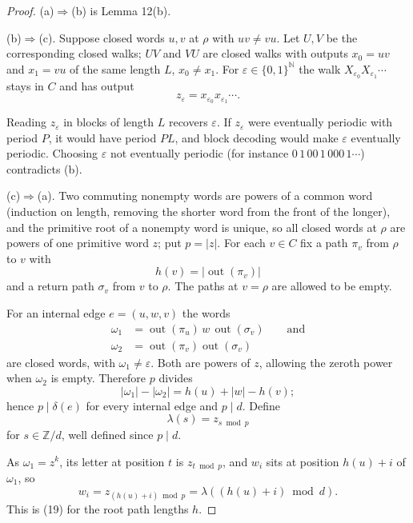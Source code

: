 \documentclass[11pt,reqno]{amsart}
\theoremstyle{definition}
\theoremstyle{remark}
\begin{document}
\begin{proof}\leavevmode\label{proof:21}
(a)\(\Rightarrow\)(b) is Lemma 12(b).

(b)\(\Rightarrow\)(c). Suppose closed words \(u,v\) at \(\rho\) with \(uv\ne vu\).
Let \(U,V\) be the corresponding closed walks; \(UV\) and \(VU\) are
closed walks with outputs \(x_0=uv\) and \(x_1=vu\) of the same length
\(L\), \(x_0\ne x_1\). For \(\varepsilon\in\{0,1\}^{\mathbb N}\) the walk
\(X_{\varepsilon_0}X_{\varepsilon_1}\cdots\) stays in \(C\) and has
output
\[
z_\varepsilon=x_{\varepsilon_0}x_{\varepsilon_1}\cdots.
\]

Reading
\(z_\varepsilon\) in blocks of length \(L\) recovers \(\varepsilon\). If
\(z_\varepsilon\) were eventually periodic with period \(P\), it would
have period \(PL\), and block decoding would make \(\varepsilon\)
eventually periodic. Choosing \(\varepsilon\) not eventually periodic
(for instance \(0\,1\,00\,1\,000\,1\cdots\)) contradicts (b).

(c)\(\Rightarrow\)(a). Two commuting nonempty words are powers of a common word
(induction on length, removing the shorter word from the front of the
longer), and the primitive root of a nonempty word is unique, so all
closed words at \(\rho\) are powers of one primitive word \(z\); put
\(p=|z|\). For each \(v\in C\) fix a path \(\pi_v\) from \(\rho\) to
\(v\) with
\[
h(v)=|\operatorname{out}(\pi_v)|
\]
and a return path \(\sigma_v\) from \(v\) to \(\rho\). The paths at
\(v=\rho\) are allowed to be empty.

For an internal edge \(e=(u,w,v)\) the words
\[
\begin{aligned}
\omega_1&=\operatorname{out}(\pi_u)\,w\,\operatorname{out}(\sigma_v)\qquad \text{and}\\
\omega_2&=\operatorname{out}(\pi_v)\operatorname{out}(\sigma_v)
\end{aligned}
\]
are closed words, with \(\omega_1\ne\varepsilon\). Both are powers
of \(z\), allowing the zeroth power when \(\omega_2\) is empty.
Therefore \(p\) divides
\[
|\omega_1|-|\omega_2|=h(u)+|w|-h(v);
\]
hence \(p\mid\delta(e)\) for every
internal edge and \(p\mid d\). Define
\[
\lambda(s)=z_{s\bmod p}
\]
for \(s\in\mathbb Z/d\), well defined since
\(p\mid d\).

As \(\omega_1=z^k\), its letter at position \(t\) is
\(z_{t\bmod p}\), and \(w_i\) sits at position \(h(u)+i\) of
\(\omega_1\), so
\[
w_i=z_{(h(u)+i)\bmod p}=\lambda((h(u)+i)\bmod d).
\]
This is (19) for the root path lengths \(h\). \qedhere
\end{proof}
\end{document}
